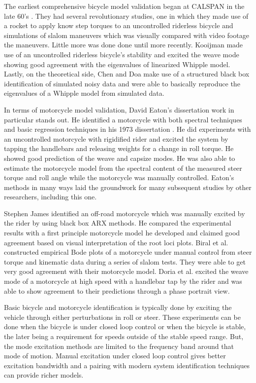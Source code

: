 \documentclass[twocolumn,10pt]{asme2e}
\begin{document}
The earliest comprehensive bicycle model validation began at CALSPAN in the
late 60's \cite{Roland1971}. They had several revolutionary studies, one in
which they made use of a rocket to apply know step torques to an uncontrolled
riderless bicycle and simulations of slalom maneuvers which was visually
compared with video footage the maneuvers. Little more was done done until more
recently. Kooijman \cite{Kooijman2006, Kooijman2009} made use of an
uncontrolled riderless bicycle's stability and excited the weave mode showing
good agreement with the eigenvalues of linearized Whipple model. Lastly, on the
theoretical side, Chen and Doa \cite{Chen2010} make use of a structured black
box identification of simulated noisy data and were able to basically reproduce
the eigenvalues of a Whipple model from simulated data.

In terms of motorcycle model validation, David Eaton's dissertation work in
particular stands out. He identified a motorcycle with both spectral techniques
and basic regression techniques in his 1973 dissertation \cite{Eaton1973}. He
did experiments with an uncontrolled motorcycle with rigidified rider and
excited the system by tapping the handlebars and releasing weights for a change
in roll torque. He showed good prediction of the weave and capsize modes.  He
was also able to estimate the motorcycle model from the spectral content of the
measured steer torque and roll angle while the motorcycle was manually
controlled. Eaton's methods in many ways laid the groundwork for many
subsequent studies by other researchers, including this one.

Stephen James \cite{James2002} identified an off-road motorcycle which was
manually excited by the rider by using black box ARX methods. He compared the
experimental results with a first principle motorcycle model he developed and
claimed good agreement based on visual interpretation of the root loci plots.
Biral et al. \cite{Biral2003} constructed empirical Bode plots of a motorcycle
under manual control from steer torque and kinematic data during a series of
slalom tests. They were able to get very good agreement with their motorcycle
model. Doria et al. \cite{Doria2012} excited the weave mode of a motorcycle at
high speed with a handlebar tap by the rider and was able to show agreement to
their predictions through a phase portrait view.

Basic bicycle and motorcycle identification is typically done by exciting the
vehicle through either perturbations in roll or steer. These experiments can be
done when the bicycle is under closed loop control or when the bicycle is
stable, the later being a requirement for speeds outside of the stable speed
range. But, the mode excitation methods are limited to the frequency band
around that mode of motion. Manual excitation under closed loop control gives
better excitation bandwidth and a pairing with modern system identification
techniques can provide richer models.
\end{document}

